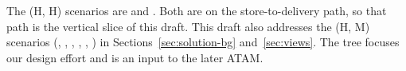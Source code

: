 The (H, H) scenarios are  and . Both are on the
store-to-\DC delivery path, so that path is the vertical slice of this draft. This draft
also addresses the (H, M) scenarios (, , ,
, , ) in Sections~\ref{sec:solution-bg}
and~\ref{sec:views}. The tree focuses our design effort and is an input to the later ATAM.
